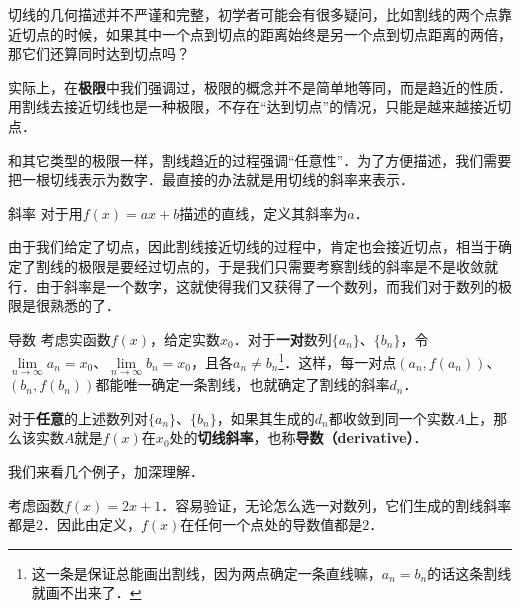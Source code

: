 



切线的几何描述并不严谨和完整，初学者可能会有很多疑问，比如割线的两个点靠近切点的时候，如果其中一个点到切点的距离始终是另一个点到切点距离的两倍，那它们还算同时达到切点吗？

实际上，在\textbf{极限}中我们强调过，极限的概念并不是简单地等同，而是趋近的性质．用割线去接近切线也是一种极限，不存在“达到切点”的情况，只能是越来越接近切点．

和其它类型的极限一样，割线趋近的过程强调“任意性”．为了方便描述，我们需要把一根切线表示为数字．最直接的办法就是用切线的斜率来表示．

\begin{definition}{斜率}
对于用$f(x)=ax+b$描述的直线，定义其斜率为$a$．
\end{definition}

由于我们给定了切点，因此割线接近切线的过程中，肯定也会接近切点，相当于确定了割线的极限是要经过切点的，于是我们只需要考察割线的斜率是不是收敛就行．由于斜率是一个数字，这就使得我们又获得了一个数列，而我们对于数列的极限是很熟悉的了．

\begin{definition}{导数}\label{Der2_def1}
考虑实函数$f(x)$，给定实数$x_0$．对于\textbf{一对}数列$\{a_n\}$、$\{b_n\}$，令$\lim\limits_{n\to\infty}a_n=x_0$、$\lim\limits_{n\to\infty}b_n=x_0$，且各$a_n\not=b_n$\footnote{这一条是保证总能画出割线，因为两点确定一条直线嘛，$a_n=b_n$的话这条割线就画不出来了．}．这样，每一对点$(a_n, f(a_n))$、$ (b_n, f(b_n))$都能唯一确定一条割线，也就确定了割线的斜率$d_n$．

对于\textbf{任意}的上述数列对$\{a_n\}$、$\{b_n\}$，如果其生成的$d_n$都收敛到同一个实数$A$上，那么该实数$A$就是$f(x)$在$x_0$处的\textbf{切线斜率}，也称\textbf{导数（derivative）}．
\end{definition}

我们来看几个例子，加深理解．

\begin{example}{}
考虑函数$f(x)=2x+1$．容易验证，无论怎么选一对数列，它们生成的割线斜率都是$2$．因此由定义，$f(x)$在任何一个点处的导数值都是$2$．
\end{example}

